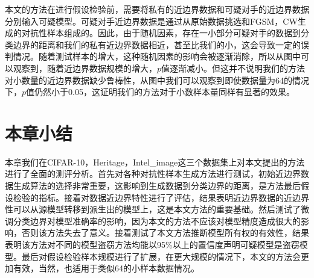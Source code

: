 本文的方法在进行假设检验前，需要将私有的近边界数据和可疑对手的近边界数据分别输入可疑模型。可疑对手近边界数据是通过从原始数据挑选和FGSM，CW生成的对抗性样本组成的。因此，由于随机因素，存在一小部分可疑对手的数据到分类边界的距离和我们的私有近边界数据相近，甚至比我们的小，这会导致一定的误判情况。随着测试样本的增大，这种随机因素的影响会被逐渐消除，所以从图中可以观察到，随着近边界数据规模的增大，$p$值逐渐减小。但这并不说明我们的方法对小数量的近边界数据缺少鲁棒性，从图中我们可以观察到即使数据量为64的情况下，$p$值仍然小于0.05，这证明我们的方法对于小数样本量同样有显著的效果。

\section{本章小结}

本章我们在CIFAR-10，Heritage，Intel\_image这三个数据集上对本文提出的方法进行了全面的测评分析。首先对各种对抗性样本生成方法进行测试，初始近边界数据生成算法的选择非常重要，这影响到生成数据到分类边界的距离，是方法最后假设检验的指标。接着对数据近边界特性进行了评估，结果表明近边界数据的近边界性可以从源模型转移到派生出的模型上，这是本文方法的重要基础。然后测试了微调分类边界对模型准确率的影响，因为本文的方法不应该对模型精度造成很大的影响，否则该方法失去了意义。接着测试了本文方法推断模型所有权的有效性，结果表明该方法对不同的模型盗窃方法均能以95\%以上的置信度声明可疑模型是盗窃模型。最后对假设检验样本规模进行了扩展，在更大规模的情况下，本文的方法会更加有效，当然，也适用于类似64的小样本数据情况。

